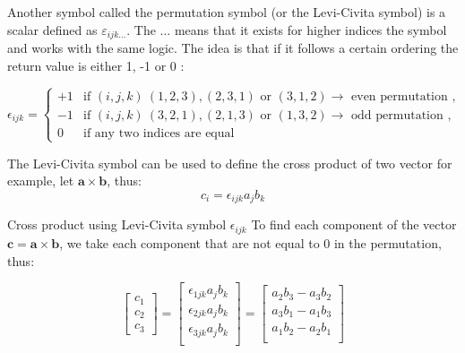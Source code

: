 Another symbol called the permutation symbol (or the Levi-Civita symbol) is a scalar defined as $\varepsilon_{ijk\dots}$. The $\dots$ means that it exists for higher indices the symbol and works with the same logic. The idea is that if it follows a certain ordering the return value is either 1, -1 or 0 :

$$
\epsilon_{ijk} =
\begin{cases}
+1 & \text{if } (i,j,k) \ (1,2,3), (2,3,1) \text{ or } (3,1,2) \rightarrow \text{ even permutation },  \\
-1 & \text{if } (i,j,k) \ (3,2,1), (2,1,3) \text{ or } (1,3,2) \rightarrow \text{ odd permutation }, \\
0 & \text{if any two indices are equal}
\end{cases}
$$

The Levi-Civita symbol can be used to define the cross product of two vector for example, let $\mathbf{a} \times \mathbf{b}$, thus:
$$c_i = \epsilon_{ijk}a_jb_k$$

\begin{example}{Cross product using Levi-Civita symbol $\epsilon_{ijk}$}
    To find each component of the vector $ \mathbf{c} = \mathbf{a} \times \mathbf{b}$, we take each component that are not equal to 0 in the permutation, thus:

    $$
        \begin{bmatrix}
            c_1 \\
            c_2 \\
            c_3
        \end{bmatrix}
        = 
        \begin{bmatrix}
            \epsilon_{1jk}a_jb_k\\
            \epsilon_{2jk}a_jb_k\\
            \epsilon_{3jk}a_jb_k\\
        \end{bmatrix}
        =
        \begin{bmatrix}
            a_2b_3 - a_3b_2\\
            a_3b_1 - a_1b_3\\
            a_1b_2 - a_2b_1\\
        \end{bmatrix}
    $$
    
\end{example}


